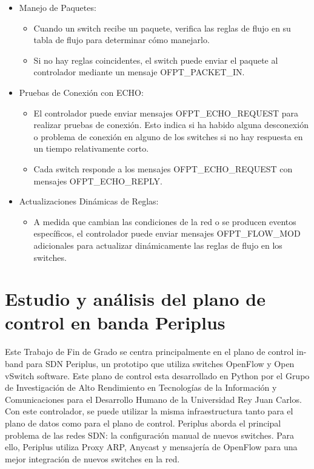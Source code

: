 \documentclass[a4paper, 12pt]{book}
\begin{document}
\begin{itemize}
	\item Manejo de Paquetes:
	\begin{itemize}
		\item Cuando un switch recibe un paquete, verifica las reglas de flujo en su tabla de
		flujo para determinar cómo manejarlo.
		\item Si no hay reglas coincidentes, el switch puede enviar el paquete al controlador
		mediante un mensaje OFPT\_PACKET\_IN.
	\end{itemize}
	
	 \item Pruebas de Conexión con ECHO:
	\begin{itemize}
		\item El controlador puede enviar mensajes OFPT\_ECHO\_REQUEST para realizar pruebas de conexión. Esto indica si ha habido alguna desconexión o problema de conexión en alguno de los switches si no hay respuesta en un tiempo relativamente corto.
		\item Cada switch responde a los mensajes OFPT\_ECHO\_REQUEST con mensajes OFPT\_ECHO\_REPLY.
	\end{itemize}
	
	\item Actualizaciones Dinámicas de Reglas:
	\begin{itemize}
		\item A medida que cambian las condiciones de la red o se producen eventos específicos,
		el controlador puede enviar mensajes OFPT\_FLOW\_MOD adicionales para actualizar
		dinámicamente las reglas de flujo en los switches.
	\end{itemize}
\end{itemize}
	
	\cleardoublepage %
	\chapter{Estudio y análisis del plano de control en banda Periplus} %
	\label{chap:periplus} %
	
	Este Trabajo de Fin de Grado se centra principalmente en el plano de control in-band para SDN Periplus, un prototipo que utiliza switches OpenFlow y Open vSwitch software. Este plano de control esta desarrollado en Python por el Grupo de Investigación de Alto Rendimiento en Tecnologías de la Información y Comunicaciones para el Desarrollo Humano de la Universidad Rey Juan Carlos. Con este controlador, se puede utilizar la misma infraestructura tanto para el plano de datos como para el plano de control.
	Periplus aborda el principal problema de las redes SDN: la configuración manual de nuevos switches.
	Para ello, Periplus utiliza Proxy ARP, Anycast y mensajería de OpenFlow para una mejor integración de nuevos switches en la red.
	
\end{document}
